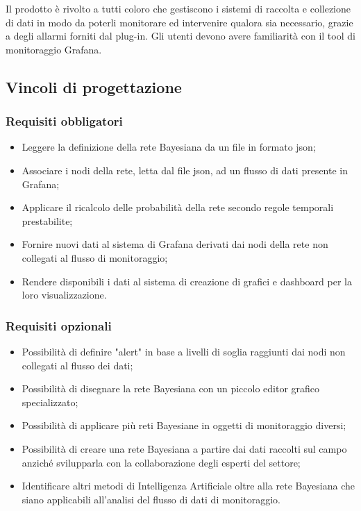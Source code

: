 Il prodotto è rivolto a tutti coloro che gestiscono i sistemi di raccolta e collezione di dati in modo da poterli monitorare ed intervenire qualora sia necessario, grazie a degli allarmi forniti dal plug-in.
Gli utenti devono avere familiarità  con il tool di monitoraggio Grafana.


		\subsection{Vincoli di progettazione}
			\subsubsection{Requisiti obbligatori}
				\begin{itemize}
					\item Leggere la definizione della rete Bayesiana da un file in formato json;
					\item Associare i nodi della rete, letta dal file json, ad un flusso di dati presente in Grafana;
					\item Applicare il ricalcolo delle probabilità della rete secondo regole temporali prestabilite;
					\item Fornire nuovi dati al sistema di Grafana derivati dai nodi della rete non collegati al flusso di monitoraggio;
					\item Rendere disponibili i dati al sistema di creazione di grafici e dashboard per la loro visualizzazione.
		        	\end{itemize}
			\subsubsection{Requisiti opzionali}
				\begin{itemize}
					\item Possibilità di definire "alert\pedice" in base a livelli di soglia raggiunti dai nodi non collegati al flusso dei dati;
					\item Possibilità di disegnare la rete Bayesiana con un piccolo editor grafico specializzato;
					\item Possibilità di applicare più reti Bayesiane in oggetti di monitoraggio diversi;
					\item Possibilità di creare una rete Bayesiana a partire dai dati raccolti sul campo anziché svilupparla con la collaborazione degli esperti del settore;
					\item Identificare altri metodi di Intelligenza Artificiale oltre alla rete Bayesiana che siano applicabili all'analisi del flusso di dati di monitoraggio.
		        	\end{itemize}
